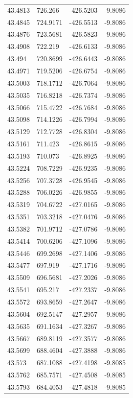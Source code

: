 \begin{table}[H]
\begin{tabular}{llll}
43.4813 & 726.266 & -426.5203 & -9.8086 \\
43.4845 & 724.9171 & -426.5513 & -9.8086 \\
43.4876 & 723.5681 & -426.5823 & -9.8086 \\
43.4908 & 722.219 & -426.6133 & -9.8086 \\
43.494 & 720.8699 & -426.6443 & -9.8086 \\
43.4971 & 719.5206 & -426.6754 & -9.8086 \\
43.5003 & 718.1712 & -426.7064 & -9.8086 \\
43.5035 & 716.8218 & -426.7374 & -9.8086 \\
43.5066 & 715.4722 & -426.7684 & -9.8086 \\
43.5098 & 714.1226 & -426.7994 & -9.8086 \\
43.5129 & 712.7728 & -426.8304 & -9.8086 \\
43.5161 & 711.423 & -426.8615 & -9.8086 \\
43.5193 & 710.073 & -426.8925 & -9.8086 \\
43.5224 & 708.7229 & -426.9235 & -9.8086 \\
43.5256 & 707.3728 & -426.9545 & -9.8086 \\
43.5288 & 706.0226 & -426.9855 & -9.8086 \\
43.5319 & 704.6722 & -427.0165 & -9.8086 \\
43.5351 & 703.3218 & -427.0476 & -9.8086 \\
43.5382 & 701.9712 & -427.0786 & -9.8086 \\
43.5414 & 700.6206 & -427.1096 & -9.8086 \\
43.5446 & 699.2698 & -427.1406 & -9.8086 \\
43.5477 & 697.919 & -427.1716 & -9.8086 \\
43.5509 & 696.5681 & -427.2026 & -9.8086 \\
43.5541 & 695.217 & -427.2337 & -9.8086 \\
43.5572 & 693.8659 & -427.2647 & -9.8086 \\
43.5604 & 692.5147 & -427.2957 & -9.8086 \\
43.5635 & 691.1634 & -427.3267 & -9.8086 \\
43.5667 & 689.8119 & -427.3577 & -9.8086 \\
43.5699 & 688.4604 & -427.3888 & -9.8086 \\
43.573 & 687.1088 & -427.4198 & -9.8085 \\
43.5762 & 685.7571 & -427.4508 & -9.8085 \\
43.5793 & 684.4053 & -427.4818 & -9.8085 \\

\end{tabular}
\end{table}
